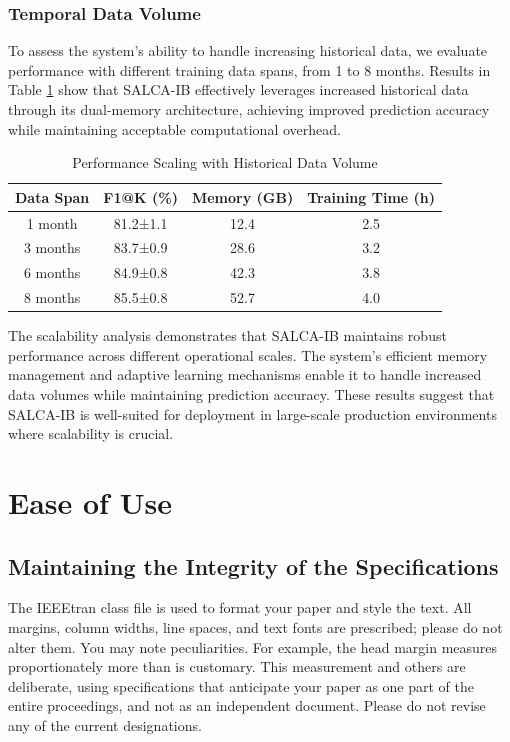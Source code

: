 \documentclass[conference]{IEEEtran}
\begin{document}
\subsubsection{Temporal Data Volume}
To assess the system's ability to handle increasing historical data, we evaluate performance with different training data spans, from 1 to 8 months. Results in Table \ref{tab:scale_temporal} show that SALCA-IB effectively leverages increased historical data through its dual-memory architecture, achieving improved prediction accuracy while maintaining acceptable computational overhead.

\begin{table}[!t]
\caption{Performance Scaling with Historical Data Volume}
\label{tab:scale_temporal}
\renewcommand{\arraystretch}{1.2}
\begin{center}
\begin{tabular}{|c|c|c|c|}
\hline
\textbf{Data Span} & \textbf{F1@K (\%)} & \textbf{Memory (GB)} & \textbf{Training Time (h)} \\
\hline
1 month & 81.2±1.1 & 12.4 & 2.5 \\
3 months & 83.7±0.9 & 28.6 & 3.2 \\
6 months & 84.9±0.8 & 42.3 & 3.8 \\
8 months & 85.5±0.8 & 52.7 & 4.0 \\
\hline
\end{tabular}
\end{center}
\end{table}

The scalability analysis demonstrates that SALCA-IB maintains robust performance across different operational scales. The system's efficient memory management and adaptive learning mechanisms enable it to handle increased data volumes while maintaining prediction accuracy. These results suggest that SALCA-IB is well-suited for deployment in large-scale production environments where scalability is crucial.

\section{Ease of Use}

\subsection{Maintaining the Integrity of the Specifications}

The IEEEtran class file is used to format your paper and style the text. All margins, 
column widths, line spaces, and text fonts are prescribed; please do not 
alter them. You may note peculiarities. For example, the head margin
measures proportionately more than is customary. This measurement 
and others are deliberate, using specifications that anticipate your paper 
as one part of the entire proceedings, and not as an independent document. 
Please do not revise any of the current designations.
\end{document}
